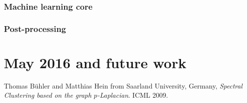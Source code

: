 \documentclass{article}
\begin{document}
\subsubsection*{Machine learning core}

\subsubsection*{Post-processing}



\section{May 2016 and future work}





\newpage

\begin{thebibliography}{9}

 Thomas Bühler and Matthias Hein from Saarland University, Germany, \textit{Spectral Clustering based on the graph $p$-Laplacian}. ICML 2009.

\end{thebibliography}
\end{document}
